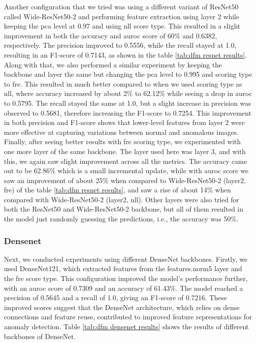 Another configuration that we tried was using a different variant of ResNet50 called Wide-ResNet50-2 and performing feature extraction using layer 2 while keeping the \gls{pca} level at 0.97 and using \gls{nll} score type. This resulted in a slight improvement in both the accuracy and \gls{auroc} score of 60\% and 0.6382, respectively. The precision improved to 0.5556, while the recall stayed at 1.0, resulting in an F1-score of 0.7143, as shown in the table \ref{tab:dfm resnet results}. Along with that, we also performed a similar experiment by keeping the backbone and layer the same but changing the \gls{pca} level to 0.995 and scoring type to \gls{fre}. This resulted in much better compared to when we used scoring type as \gls{nll}, where accuracy increased by about 2\% to 62.12\% while seeing a drop in \gls{auroc} to 0.5795. The recall stayed the same at 1.0, but a slight increase in precision was observed to 0.5681, therefore increasing the F1-score to 0.7254. This improvement in both precision and F1-score shows that lower-level features from layer 2 were more effective at capturing variations between normal and anomalous images. Finally, after seeing better results with \gls{fre} scoring type, we experimented with one more layer of the same backbone. The layer used here was layer 3, and with this, we again saw slight improvement across all the metrics. The accuracy came out to be 62.86\% which is a small incremental update, while with \gls{auroc} score we saw an improvement of about 25\% when compared to Wide-ResNet50-2 (layer2, \gls{fre}) of the table \ref{tab:dfm resnet results}, and saw a rise of about 14\% when compared with Wide-ResNet50-2 (layer2, \gls{nll}). Other layers were also tried for both the ResNet50 and Wide-ResNet50-2 backbone, but all of them resulted in the model just randomly guessing the predictions, i.e., the accuracy was 50\%.

\subsubsection*{Densenet}

Next, we conducted experiments using different DenseNet backbones. Firstly, we used DenseNet121, which extracted features from the features.norm5 layer and the \gls{fre} score type. This configuration improved the model's performance further, with an \gls{auroc} score of 0.7309 and an accuracy of 61.43\%. The model reached a precision of 0.5645 and a recall of 1.0, giving an F1-score of 0.7216. These improved scores suggest that the DenseNet architecture, which relies on dense connections and feature reuse, contributed to improved feature representations for anomaly detection. Table \ref{tab:dfm densenet results} shows the results of different backbones of DenseNet.

